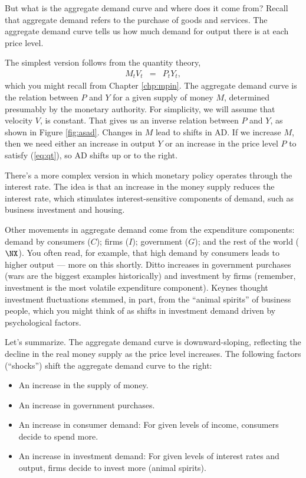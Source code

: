 But what is the aggregate demand curve and where does it come from?
Recall that aggregate demand refers to the purchase of goods and services.
The aggregate demand curve tells us how much demand for output
there is at each price level.

The simplest version follows from the quantity theory,
\begin{eqnarray}
    M_t V_t &=& P_t Y_t ,
    \label{eq:qt}
\end{eqnarray}
which you might recall from Chapter \ref{chp:mpin}.
The aggregate demand curve is the relation between $P$ and $Y$ for a
given supply of money $M$,
determined presumably by the monetary authority.
For simplicity, we will assume that velocity $V$, is constant.
That gives us an inverse relation between $P$ and $Y$,
as shown in Figure \ref{fig:asad}.
Changes in $M$ lead to shifts in AD.
If we increase $M$, then we need either an increase in output $Y$
or an increase in the price level $P$ to satisfy (\ref{eq:qt}),
so AD shifts up or to the right.

There's a more complex version in which monetary policy operates
through the interest rate.
The idea is that an increase in the money supply reduces
the interest rate,
which stimulates interest-sensitive components of demand,
such as business investment and housing.

Other movements in aggregate demand come from the expenditure components:
demand by consumers ($C$); firms ($I$); government ($G$);
and the rest of the world ($\NX$).
You often read, for example, that high demand by consumers
leads to higher output --- more on this shortly.
Ditto increases in government purchases
(wars are the biggest examples historically)
and investment by firms (remember, investment is the most volatile
expenditure component).
Keynes thought investment fluctuations stemmed,
in part, from the ``animal spirits'' of business people,
which you might think of as shifts in investment demand
driven by psychological factors.



Let's summarize.
The aggregate demand curve is downward-sloping, reflecting
the decline in the real money supply as the price level increases.
The following factors (``shocks'')
shift the aggregate demand curve to the right:
%
\begin{itemize}
\item An increase in the supply of money.
\item An increase in government purchases.
\item An increase in consumer demand:  For given levels of income,
consumers decide to spend more.
\item An increase in investment demand:
For given levels of interest rates and output,
firms decide to invest more (animal spirits).
\end{itemize}


